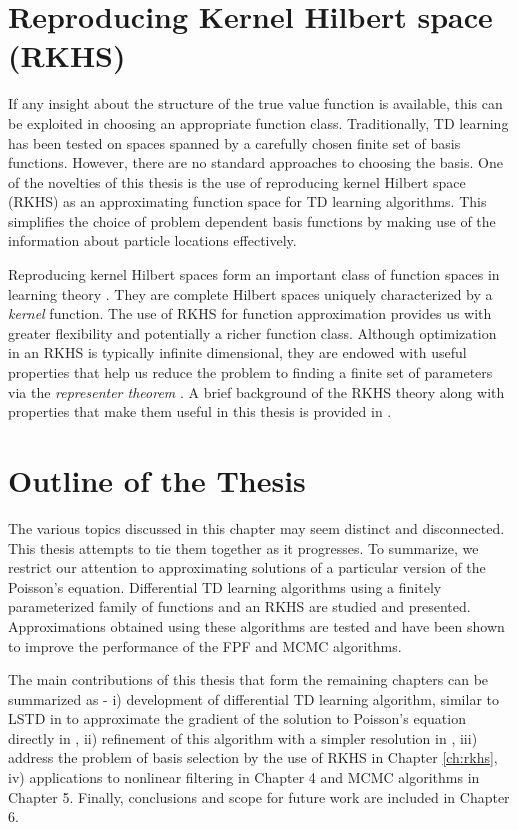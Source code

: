 \section{Reproducing Kernel Hilbert space (RKHS)}
 If any insight about the structure of the true value function is available, this can be exploited in choosing an appropriate function class. Traditionally, TD learning has been tested on spaces spanned by a carefully chosen finite set of basis functions. However, there are no standard approaches to choosing the basis. One of the novelties of this thesis is the use of reproducing kernel Hilbert space (RKHS) as an approximating function space for TD learning algorithms. This simplifies the choice of problem dependent basis functions by making use of the information about particle locations effectively. 
 
Reproducing kernel Hilbert spaces form an important class of function spaces in learning theory \cite{aro50, schsmo01}. They are complete Hilbert spaces uniquely characterized by a \textit{kernel} function. The use of RKHS for function approximation provides us with greater flexibility and potentially a richer function class. Although optimization in an RKHS is typically infinite dimensional, they are endowed with useful properties that help us reduce the problem to finding a finite set of parameters via the \textit{representer theorem} \cite{kimwah71, schhersmo01}. A brief background of the RKHS theory along with properties that make them useful in this thesis is provided in . 
 

\section{Outline of the Thesis}
The various topics discussed in this chapter may seem distinct and disconnected. This thesis attempts to tie them together as it progresses. To summarize, we restrict our attention to approximating solutions of a particular version of the Poisson's equation. Differential TD learning algorithms using a finitely parameterized family of functions and an RKHS are studied and presented. Approximations obtained using these algorithms are tested and have been shown to improve the performance of the FPF and MCMC algorithms. 

The main contributions of this thesis that form the remaining chapters can be summarized as - i) development of differential TD learning algorithm, similar to LSTD in \cite{ctcn} to approximate the gradient of the solution to Poisson's equation directly in , ii) refinement of this algorithm with a simpler resolution \cite{radmey18a} in , iii) address the problem of basis selection by the use of RKHS in Chapter \ref{ch:rkhs}, iv) applications to nonlinear filtering in Chapter 4 and MCMC algorithms in Chapter 5. Finally, conclusions and scope for future work are included in Chapter 6.  

